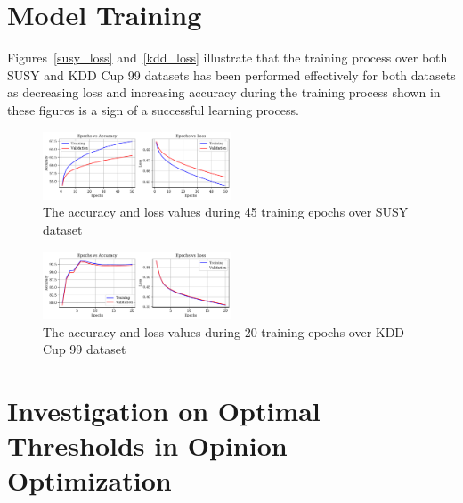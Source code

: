 {\color{red}
\section{Model Training}
\label{train_app}
Figures~\ref{susy_loss} and~\ref{kdd_loss} illustrate that the training process over both SUSY and KDD Cup 99 datasets has been performed effectively for both datasets as decreasing loss and increasing accuracy during the training process shown in these figures is a sign of a successful learning process. 
\begin{figure}[ht]  %
	\centering
	\includegraphics[width=0.5\textwidth]{figures/Results_susy.pdf}
	\vspace{-0.3cm}
	\caption{The accuracy and loss values during 45 training epochs over SUSY dataset}
\end{figure}
\begin{figure}[ht] %
\centering
\includegraphics[width=0.5\textwidth]{figures/Results_kdd.pdf}
\vspace{-0.3cm}
\caption{The accuracy and loss values during 20 training epochs over KDD Cup 99 dataset}
\end{figure}
}

\section{Investigation on Optimal Thresholds in Opinion Optimization}
\label{thr_app}

